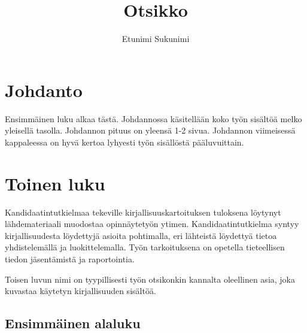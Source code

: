 \documentclass[utf8,bachelor,manualbib]{gradu3}
\begin{document}
\title{Otsikko}



\author{Etunimi Sukunimi}

\maketitle
  
\mainmatter

\chapter{Johdanto}

Ensimmäinen luku alkaa tästä. Johdannossa käsitellään koko työn sisältöä melko yleisellä tasolla. Johdannon pituus on yleensä 1-2 sivua. Johdannon viimeisessä kappaleessa on hyvä kertoa lyhyesti työn sisällöstä pääluvuittain.

\chapter{Toinen luku} \label{lukuviite} %

Kandidaatintutkielmaa tekeville kirjallisuuskartoituksen tuloksena löytynyt lähdemateriaali muodostaa opinnäytetyön ytimen. Kandidaatintutkielma syntyy kirjallisuudesta löydettyjä asioita pohtimalla, eri lähteistä löydettyä tietoa yhdistelemällä ja luokittelemalla. Työn tarkoituksena on opetella tieteellisen tiedon jäsentämistä ja raportointia.

Toisen luvun nimi on tyypillisesti työn otsikonkin kannalta oleellinen asia, joka kuvastaa käytetyn kirjallisuuden sisältöä.

\section{Ensimmäinen alaluku}
\end{document}
